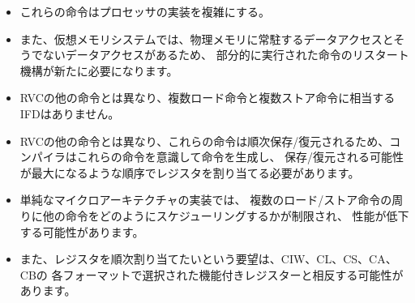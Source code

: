 \begin{commentary}
\begin{comment}
\begin{itemize}
\item These instructions complicate processor implementations.
\item For virtual memory systems, some data accesses could be
      resident in physical memory and some could not, which requires a
      new restart mechanism for partially executed instructions.
\item Unlike the rest of the RVC instructions, there is no IFD
      equivalent to Load Multiple and Store Multiple.
\item Unlike the rest of the RVC instructions, the compiler would
      have to be aware of these instructions to both generate the
      instructions and to allocate registers in an order to maximize
      the chances of the them being saved and stored, since they would
      be saved and restored in sequential order.
\item Simple microarchitectural implementations will constrain how
      other instructions can be scheduled around the load and store
      multiple instructions, leading to a potential performance loss.
\item The desire for sequential register allocation might conflict with
      the featured registers selected for the CIW, CL, CS, CA, and CB formats.
\end{itemize}
\end{comment}
\begin{itemize}
\item これらの命令はプロセッサの実装を複雑にする。
\item また、仮想メモリシステムでは、物理メモリに常駐するデータアクセスとそうでないデータアクセスがあるため、
  部分的に実行された命令のリスタート機構が新たに必要になります。
\item RVCの他の命令とは異なり、複数ロード命令と複数ストア命令に相当するIFDはありません。
\item RVCの他の命令とは異なり、これらの命令は順次保存/復元されるため、コンパイラはこれらの命令を意識して命令を生成し、
  保存/復元される可能性が最大になるような順序でレジスタを割り当てる必要があります。
\item 単純なマイクロアーキテクチャの実装では、
  複数のロード/ストア命令の周りに他の命令をどのようにスケジューリングするかが制限され、
  性能が低下する可能性があります。
\item また、レジスタを順次割り当てたいという要望は、CIW、CL、CS、CA、CBの
  各フォーマットで選択された機能付きレジスターと相反する可能性があります。
\end{itemize}


\end{commentary}
